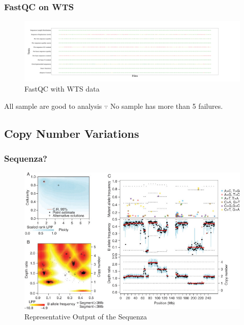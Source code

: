 \documentclass{beamer}
\begin{document}
    \begin{frame}
        \frametitle{FastQC on WTS}

        \begin{figure}
            \includegraphics[width=\linewidth]{figures/FastQC/FastQC_WTS.pdf}
            \caption{FastQC with WTS data}
        \end{figure}

        \begin{exampleblock}{All sample are good to analysis}
            $\because$ No sample has more than 5 failures.
        \end{exampleblock}
    \end{frame}

    \subsection{Copy Number Variations}
    \begin{frame}
        \frametitle{Sequenza?}

        \begin{figure}
            \includegraphics[width=0.6 \linewidth]{figures/Workflow/sequenza.jpg}
            \caption{Representative Output of the Sequenza \protect\cite{sequenza1}}
        \end{figure}
    \end{frame}
\end{document}
